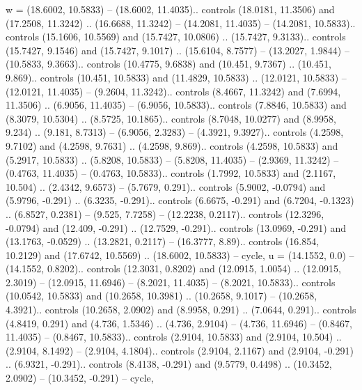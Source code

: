{w} = {(18.6002, 10.5833) -- (18.6002, 11.4035).. controls (18.0181, 11.3506) and (17.2508, 11.3242) .. (16.6688, 11.3242) -- (14.2081, 11.4035) -- (14.2081, 10.5833).. controls (15.1606, 10.5569) and (15.7427, 10.0806) .. (15.7427, 9.3133).. controls (15.7427, 9.1546) and (15.7427, 9.1017) .. (15.6104, 8.7577) -- (13.2027, 1.9844) -- (10.5833, 9.3663).. controls (10.4775, 9.6838) and (10.451, 9.7367) .. (10.451, 9.869).. controls (10.451, 10.5833) and (11.4829, 10.5833) .. (12.0121, 10.5833) -- (12.0121, 11.4035) -- (9.2604, 11.3242).. controls (8.4667, 11.3242) and (7.6994, 11.3506) .. (6.9056, 11.4035) -- (6.9056, 10.5833).. controls (7.8846, 10.5833) and (8.3079, 10.5304) .. (8.5725, 10.1865).. controls (8.7048, 10.0277) and (8.9958, 9.234) .. (9.181, 8.7313) -- (6.9056, 2.3283) -- (4.3921, 9.3927).. controls (4.2598, 9.7102) and (4.2598, 9.7631) .. (4.2598, 9.869).. controls (4.2598, 10.5833) and (5.2917, 10.5833) .. (5.8208, 10.5833) -- (5.8208, 11.4035) -- (2.9369, 11.3242) -- (0.4763, 11.4035) -- (0.4763, 10.5833).. controls (1.7992, 10.5833) and (2.1167, 10.504) .. (2.4342, 9.6573) -- (5.7679, 0.291).. controls (5.9002, -0.0794) and (5.9796, -0.291) .. (6.3235, -0.291).. controls (6.6675, -0.291) and (6.7204, -0.1323) .. (6.8527, 0.2381) -- (9.525, 7.7258) -- (12.2238, 0.2117).. controls (12.3296, -0.0794) and (12.409, -0.291) .. (12.7529, -0.291).. controls (13.0969, -0.291) and (13.1763, -0.0529) .. (13.2821, 0.2117) -- (16.3777, 8.89).. controls (16.854, 10.2129) and (17.6742, 10.5569) .. (18.6002, 10.5833) -- cycle},
{u} = {(14.1552, 0.0) -- (14.1552, 0.8202).. controls (12.3031, 0.8202) and (12.0915, 1.0054) .. (12.0915, 2.3019) -- (12.0915, 11.6946) -- (8.2021, 11.4035) -- (8.2021, 10.5833).. controls (10.0542, 10.5833) and (10.2658, 10.3981) .. (10.2658, 9.1017) -- (10.2658, 4.3921).. controls (10.2658, 2.0902) and (8.9958, 0.291) .. (7.0644, 0.291).. controls (4.8419, 0.291) and (4.736, 1.5346) .. (4.736, 2.9104) -- (4.736, 11.6946) -- (0.8467, 11.4035) -- (0.8467, 10.5833).. controls (2.9104, 10.5833) and (2.9104, 10.504) .. (2.9104, 8.1492) -- (2.9104, 4.1804).. controls (2.9104, 2.1167) and (2.9104, -0.291) .. (6.9321, -0.291).. controls (8.4138, -0.291) and (9.5779, 0.4498) .. (10.3452, 2.0902) -- (10.3452, -0.291) -- cycle},
